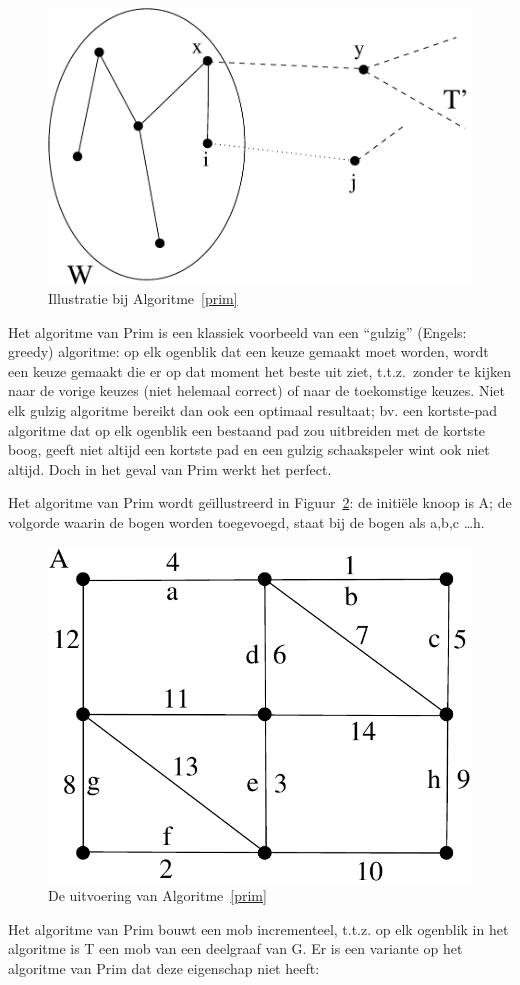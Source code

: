 \begin{figure}[ht]
\begin{center}
\includegraphics[width=0.4\linewidth,keepaspectratio]{prim2}
\end{center}
\caption{Illustratie bij Algoritme~\ref{prim} \label{prim2}}
\end{figure}


Het algoritme van Prim is een klassiek voorbeeld van een ``gulzig''
(Engels: greedy) algoritme: op elk ogenblik dat een keuze gemaakt moet
worden, wordt een keuze gemaakt die er op dat moment het beste uit
ziet, t.t.z.\ zonder te kijken naar de vorige keuzes (niet helemaal
correct) of naar de toekomstige keuzes. Niet elk gulzig algoritme
bereikt dan ook een optimaal resultaat; bv. een kortste-pad algoritme
dat op elk ogenblik een bestaand pad zou uitbreiden met de kortste
boog, geeft niet altijd een kortste pad en een gulzig schaakspeler
wint ook niet altijd. Doch in het geval van Prim werkt het perfect.

Het algoritme van Prim wordt ge\"{\i}llustreerd in Figuur~\ref{prim1}: de
initi\"ele knoop is A; de volgorde waarin de bogen worden toegevoegd,
staat bij de bogen als a,b,c \ldots h.

\begin{figure}[ht]
\begin{center}
\includegraphics[width=0.3\linewidth,keepaspectratio]{prim1} %
\end{center}
\caption{De uitvoering van Algoritme~\ref{prim} \label{prim1}}
\end{figure}


Het algoritme van Prim bouwt een mob incrementeel, t.t.z. op elk
ogenblik in het algoritme is T een mob van een deelgraaf van G. Er is
een variante op het algoritme van Prim dat deze eigenschap niet heeft:

